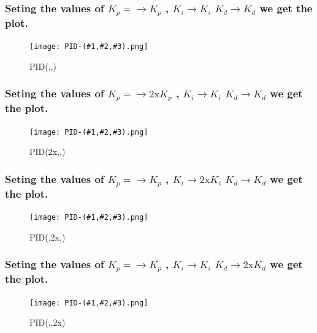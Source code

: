 \newcommand{\plott}[3]{
\subsubsection{Seting the values of $K_p = \to \text{#1} K_p$ , $K_i \to \text{#2} K_i $ $K_d \to \text{#3} K_d$ we get the plot.}
\begin{figure}[H]
    \texttt{[image: PID-(\#1,\#2,\#3).png]}
    \caption{PID(#1,#2,#3)}{
    }
\end{figure}
}
\plott{}{}{}
\plott{2x}{}{}
\plott{}{2x}{}
\plott{}{}{2x}

\setcounter{equation}{0}
\setcounter{table}{0}
\setcounter{figure}{0}


    



